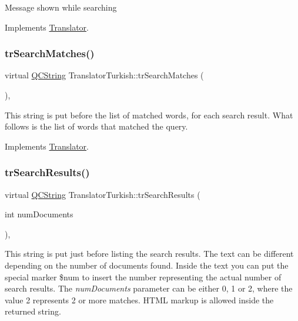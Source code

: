 Message shown while searching 

Implements \mbox{\hyperlink{class_translator}{Translator}}.

\mbox{\label{class_translator_turkish_a1803e1336c6bbeea53fc587c38909289}} 
\subsubsection{\texorpdfstring{trSearchMatches()}{trSearchMatches()}}
{\footnotesize\ttfamily virtual \mbox{\hyperlink{class_q_c_string}{Q\+C\+String}} Translator\+Turkish\+::tr\+Search\+Matches (\begin{DoxyParamCaption}{ }\end{DoxyParamCaption})\hspace{0.3cm}{\ttfamily [inline]}, {\ttfamily [virtual]}}

This string is put before the list of matched words, for each search result. What follows is the list of words that matched the query. 

Implements \mbox{\hyperlink{class_translator}{Translator}}.

\mbox{\label{class_translator_turkish_a40fe3297456823e5f3fdd934fdcdd548}} 
\subsubsection{\texorpdfstring{trSearchResults()}{trSearchResults()}}
{\footnotesize\ttfamily virtual \mbox{\hyperlink{class_q_c_string}{Q\+C\+String}} Translator\+Turkish\+::tr\+Search\+Results (\begin{DoxyParamCaption}\item[{int}]{num\+Documents }\end{DoxyParamCaption})\hspace{0.3cm}{\ttfamily [inline]}, {\ttfamily [virtual]}}

This string is put just before listing the search results. The text can be different depending on the number of documents found. Inside the text you can put the special marker \$num to insert the number representing the actual number of search results. The {\itshape num\+Documents} parameter can be either 0, 1 or 2, where the value 2 represents 2 or more matches. H\+T\+ML markup is allowed inside the returned string. 

